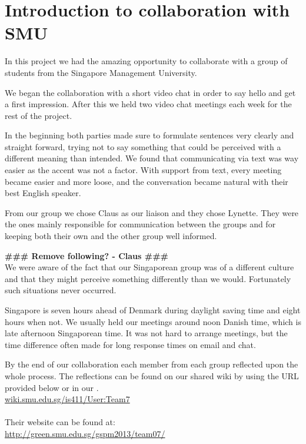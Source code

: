 \section{Introduction to collaboration with SMU}
In this project we had the amazing opportunity to collaborate with a group of students from the Singapore Management University.

We began the collaboration with a short video chat in order to say hello and get a first impression. After this we held two video chat meetings each week for the rest of the project.

In the beginning both parties made sure to formulate sentences very clearly and straight forward, trying not to say something that could be perceived with a different meaning than intended. We found that communicating via text was way easier as the accent was not a factor.
With support from text, every meeting became easier and more loose, and the conversation became natural with their best English speaker.

From our group we chose Claus as our liaison and they chose Lynette. They were the ones mainly responsible for communication between the groups and for keeping both their own and the other group well informed.

\textbf{\#\#\# Remove following? - Claus \#\#\#}\\
We were aware of the fact that our Singaporean group was of a different culture and that they might perceive something differently than we would. Fortunately such situations never occurred.

Singapore is seven hours ahead of Denmark during daylight saving time and eight hours when not. We usually held our meetings around noon Danish time, which is late afternoon Singaporean time. It was not hard to arrange meetings, but the time difference often made for long response times on email and chat.

By the end of our collaboration each member from each group reflected upon the whole process. The reflections can be found on our shared wiki by using the URL provided below or in our .
\\\url{wiki.smu.edu.sg/is411/User:Team7}\\\\

Their website can be found at:
\\\url{http://green.smu.edu.sg/gspm2013/team07/}
\newpage